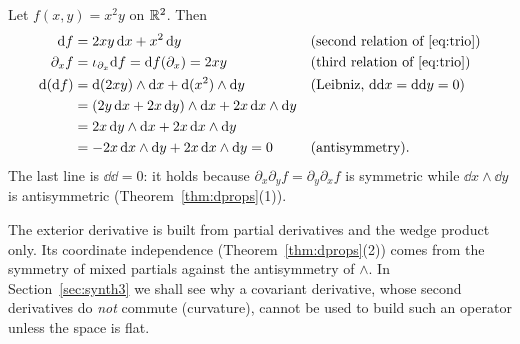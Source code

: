 \begin{example}\label{ex:onefunction}
Let $f(x,y)=x^2y$ on $\mathbb{R}^2$. Then
\begin{align*}
\mathrm{d} f&=2xy\,\mathrm{d} x+x^2\,\mathrm{d} y &&\text{(second relation of \eqref{eq:trio})}\\
\partial_xf&=\iota_{\partial_x}\mathrm{d} f=\mathrm{d} f(\partial_x)=2xy &&\text{(third relation of \eqref{eq:trio})}\\
\mathrm{d}(\mathrm{d} f)&=\mathrm{d}(2xy)\wedge\mathrm{d} x+\mathrm{d}(x^2)\wedge\mathrm{d} y &&\text{(Leibniz, $\mathrm{d}\mathrm{d} x=\mathrm{d}\mathrm{d} y=0$)}\\
&=(2y\,\mathrm{d} x+2x\,\mathrm{d} y)\wedge\mathrm{d} x+2x\,\mathrm{d} x\wedge\mathrm{d} y\\
&=2x\,\mathrm{d} y\wedge\mathrm{d} x+2x\,\mathrm{d} x\wedge\mathrm{d} y\\
&=-2x\,\mathrm{d} x\wedge\mathrm{d} y+2x\,\mathrm{d} x\wedge\mathrm{d} y=0 &&\text{(antisymmetry).}
\end{align*}
The last line is $\dd\dd=0$: it holds because $\partial_x\partial_yf=\partial_y\partial_xf$ is symmetric while $\dd x\wedge\dd y$ is antisymmetric (Theorem~\ref{thm:dprops}(1)).
\end{example}

\begin{keyidea}
The exterior derivative is built from partial derivatives and the wedge product only. Its coordinate independence (Theorem~\ref{thm:dprops}(2)) comes from the symmetry of mixed partials against the antisymmetry of $\wedge$.
In Section~\ref{sec:synth3} we shall see why a covariant derivative, whose second derivatives do \emph{not} commute (curvature), cannot be used to build such an operator unless the space is flat.
\end{keyidea}
